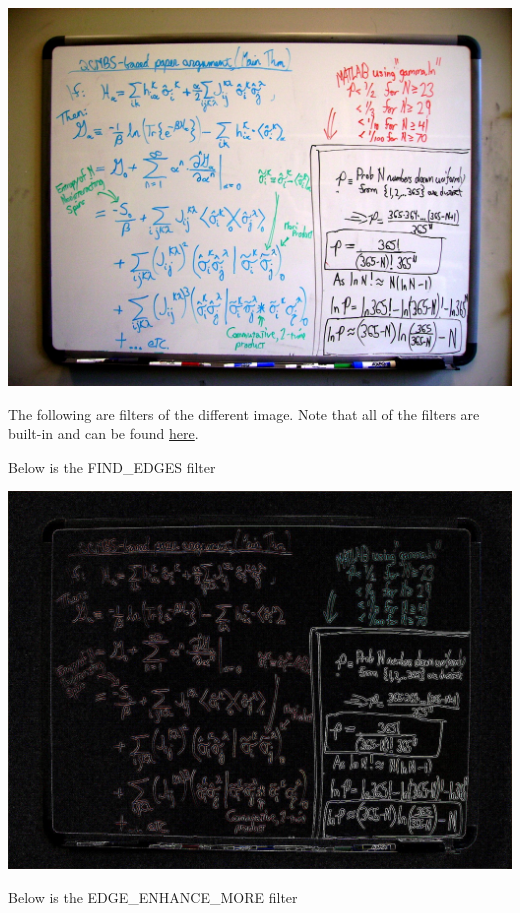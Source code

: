 \documentclass[]{article}
\begin{document}
			\includegraphics{images/python-filters/original.jpg}
			
			The following are filters of the different image. Note that all of the filters are built-in and can be found \href{http://www.pythonware.com/library/pil/handbook/imagefilter.htm}{here}.
			
			Below is the FIND\_EDGES filter
			
			\includegraphics[scale=0.238]{images/python-filters/find-edges.jpg}
			
			Below is the EDGE\_ENHANCE\_MORE filter
			
\end{document}
